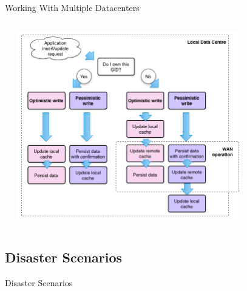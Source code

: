 \documentclass[aspectratio=169]{beamer}
\begin{document}
\begin{frame}{Working With Multiple Datacenters}
    \begin{columns}
        \begin{column}[c]{0.1\textwidth}
        \end{column}
        \begin{column}[c]{0.8\textwidth}
            \includegraphics[width=0.8\textwidth]{images/multidcops.png}
        \end{column}
        \begin{column}[c]{0.1\textwidth}
        \end{column}
    \end{columns}
\end{frame}

\subsection{Disaster Scenarios}

{
\begin{frame}{Disaster Scenarios}
\end{frame}
}
\end{document}
